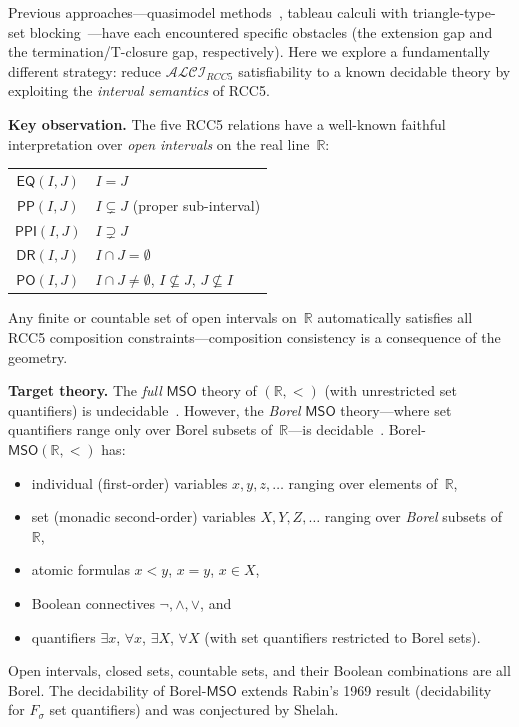 \documentclass[a4paper,11pt]{article}
\theoremstyle{definition}
\newcommand{\ALCIRCC}[1]{\ensuremath{\mathcal{ALCI}_{\mathit{RCC#1}}}}
\newcommand{\DR}{\ensuremath{\mathsf{DR}}}
\newcommand{\PO}{\ensuremath{\mathsf{PO}}}
\newcommand{\EQ}{\ensuremath{\mathsf{EQ}}}
\newcommand{\PP}{\ensuremath{\mathsf{PP}}}
\newcommand{\PPI}{\ensuremath{\mathsf{PPI}}}
\newcommand{\MSO}{\ensuremath{\mathsf{MSO}}}
\newcommand{\reals}{\ensuremath{\mathbb{R}}}
\begin{document}
Previous approaches---quasimodel
methods~\cite{OurMainPaper}, tableau calculi with triangle-type-set
blocking~\cite{TableauPaper}---have each encountered specific
obstacles (the extension gap and the termination/T-closure gap,
respectively).  Here we explore a fundamentally different strategy:
reduce $\ALCIRCC{5}$ satisfiability to a known decidable theory by
exploiting the \emph{interval semantics} of RCC5.

\medskip
\noindent
\textbf{Key observation.}\;
The five RCC5 relations have a well-known faithful interpretation
over \emph{open intervals} on the real line~$\reals$:
\begin{center}
\renewcommand{\arraystretch}{1.2}
\begin{tabular}{cl}
$\EQ(I,J)$  & $I = J$ \\
$\PP(I,J)$  & $I \subsetneq J$ (proper sub-interval) \\
$\PPI(I,J)$ & $I \supsetneq J$ \\
$\DR(I,J)$  & $I \cap J = \emptyset$ \\
$\PO(I,J)$  & $I \cap J \neq \emptyset$, $I \not\subseteq J$,
               $J \not\subseteq I$
\end{tabular}
\end{center}
Any finite or countable set of open intervals on~$\reals$
automatically satisfies all RCC5 composition constraints---composition
consistency is a consequence of the geometry.

\medskip
\noindent
\textbf{Target theory.}\;
The \emph{full} $\MSO$ theory of $(\reals, <)$ (with unrestricted
set quantifiers) is undecidable~\cite{Shelah1975,GurevichShelah1982}.
However, the \emph{Borel} $\MSO$ theory---where set quantifiers
range only over Borel subsets of~$\reals$---is
decidable~\cite{Manthe2024}.  Borel-$\MSO(\reals, <)$ has:
\begin{itemize}[nosep]
  \item individual (first-order) variables $x, y, z, \ldots$ ranging
    over elements of~$\reals$,
  \item set (monadic second-order) variables $X, Y, Z, \ldots$
    ranging over \emph{Borel} subsets of~$\reals$,
  \item atomic formulas $x < y$, $x = y$, $x \in X$,
  \item Boolean connectives $\neg, \land, \lor$, and
  \item quantifiers $\exists x$, $\forall x$, $\exists X$,
    $\forall X$ (with set quantifiers restricted to Borel sets).
\end{itemize}
Open intervals, closed sets, countable sets, and their Boolean
combinations are all Borel.  The decidability of Borel-$\MSO$
extends Rabin's 1969 result (decidability for $F_\sigma$ set
quantifiers) and was conjectured by Shelah.
\end{document}
